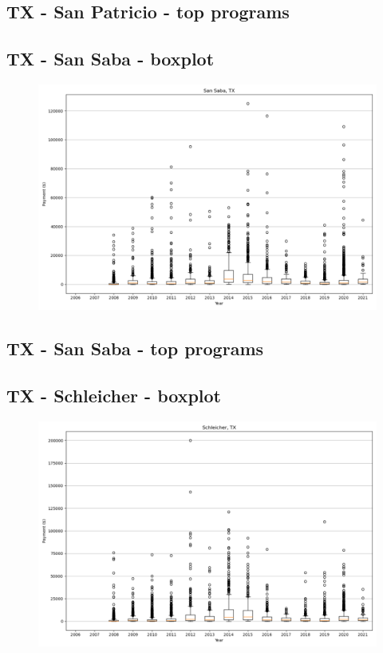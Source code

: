 \subsection*{TX - San Patricio - top programs}

\newpage
\subsection*{TX - San Saba - boxplot}
\begin{figure}[h]
\centering
\includegraphics[width=7in]{../output/boxplots/counties/San Saba-TX_boxplot.png}
\end{figure}


\subsection*{TX - San Saba - top programs}

\newpage
\subsection*{TX - Schleicher - boxplot}
\begin{figure}[h]
\centering
\includegraphics[width=7in]{../output/boxplots/counties/Schleicher-TX_boxplot.png}
\end{figure}


